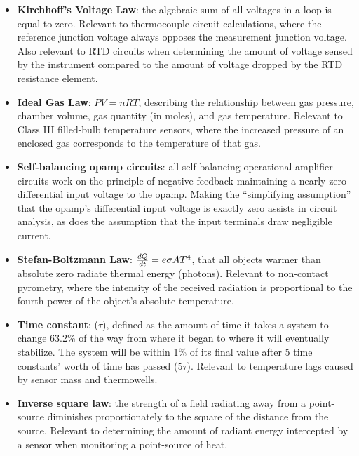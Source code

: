 \begin{itemize}
\item \textbf{Kirchhoff's Voltage Law}: the algebraic sum of all voltages in a loop is equal to zero.  Relevant to thermocouple circuit calculations, where the reference junction voltage always opposes the measurement junction voltage.  Also relevant to RTD circuits when determining the amount of voltage sensed by the instrument compared to the amount of voltage dropped by the RTD resistance element.
\item \textbf{Ideal Gas Law}: $PV = nRT$, describing the relationship between gas pressure, chamber volume, gas quantity (in moles), and gas temperature.  Relevant to Class III filled-bulb temperature sensors, where the increased pressure of an enclosed gas corresponds to the temperature of that gas.
\item \textbf{Self-balancing opamp circuits}: all self-balancing operational amplifier circuits work on the principle of negative feedback maintaining a nearly zero differential input voltage to the opamp.  Making the ``simplifying assumption'' that the opamp's differential input voltage is exactly zero assists in circuit analysis, as does the assumption that the input terminals draw negligible current.
\item \textbf{Stefan-Boltzmann Law}: ${dQ \over dt} = e \sigma A T^4$, that all objects warmer than absolute zero radiate thermal energy (photons).  Relevant to non-contact pyrometry, where the intensity of the received radiation is proportional to the fourth power of the object's absolute temperature.
\item \textbf{Time constant}: ($\tau$), defined as the amount of time it takes a system to change 63.2\% of the way from where it began to where it will eventually stabilize.  The system will be within 1\% of its final value after 5 time constants' worth of time has passed ($5 \tau$).  Relevant to temperature lags caused by sensor mass and thermowells.
\item \textbf{Inverse square law}: the strength of a field radiating away from a point-source diminishes proportionately to the square of the distance from the source.  Relevant to determining the amount of radiant energy intercepted by a sensor when monitoring a point-source of heat.
\end{itemize}















